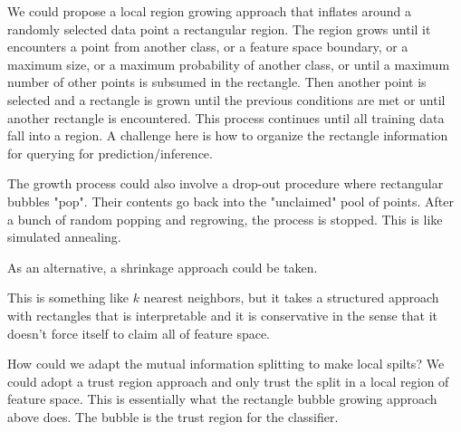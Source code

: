 \documentclass{article}
\begin{document}
We could propose a local region growing approach that inflates around a randomly selected data point a rectangular region.  The region grows until it encounters a point from another class, or a feature space boundary, or a maximum size, or a maximum probability of another class, or until a maximum number of other points is subsumed in the rectangle.  Then another point is selected and a rectangle is grown until the previous conditions are met or until another rectangle is encountered.  This process continues until all training data fall into a region.  A challenge here is how to organize the rectangle information for querying for prediction/inference.

The growth process could also involve a drop-out procedure where rectangular bubbles "pop".  Their contents go back into the "unclaimed" pool of points.  After a bunch of random popping and regrowing, the process is stopped.  This is like simulated annealing.

As an alternative, a shrinkage approach could be taken.

This is something like $k$ nearest neighbors, but it takes a structured approach with rectangles that is interpretable and it is conservative in the sense that it doesn't force itself to claim all of feature space.

How could we adapt the mutual information splitting to make local spilts?  We could adopt a trust region approach and only trust the split in a local region of feature space.  This is essentially what the rectangle bubble growing approach above does.  The bubble is the trust region for the classifier.



\end{document}
